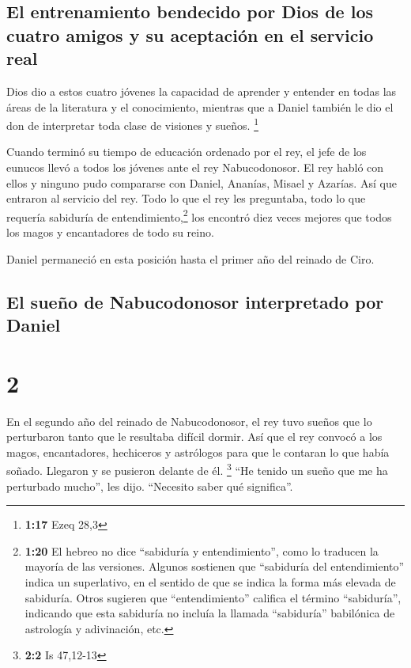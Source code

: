 \hypertarget{el-entrenamiento-bendecido-por-dios-de-los-cuatro-amigos-y-su-aceptaciuxf3n-en-el-servicio-real}{%
\subsection{El entrenamiento bendecido por Dios de los cuatro amigos y
su aceptación en el servicio
real}\label{el-entrenamiento-bendecido-por-dios-de-los-cuatro-amigos-y-su-aceptaciuxf3n-en-el-servicio-real}}

 Dios dio a estos cuatro jóvenes la capacidad de aprender
y entender en todas las áreas de la literatura y el conocimiento,
mientras que a Daniel también le dio el don de interpretar toda clase de
visiones y sueños. \footnote{\textbf{1:17} Ezeq 28,3}

 Cuando terminó su tiempo de educación ordenado por el
rey, el jefe de los eunucos llevó a todos los jóvenes ante el rey
Nabucodonosor.  El rey habló con ellos y ninguno pudo
compararse con Daniel, Ananías, Misael y Azarías. Así que entraron al
servicio del rey.  Todo lo que el rey les preguntaba,
todo lo que requería sabiduría de entendimiento,\footnote{\textbf{1:20}
  El hebreo no dice ``sabiduría y entendimiento'', como lo traducen la
  mayoría de las versiones. Algunos sostienen que ``sabiduría del
  entendimiento'' indica un superlativo, en el sentido de que se indica
  la forma más elevada de sabiduría. Otros sugieren que
  ``entendimiento'' califica el término ``sabiduría'', indicando que
  esta sabiduría no incluía la llamada ``sabiduría'' babilónica de
  astrología y adivinación, etc.} los encontró diez veces mejores que
todos los magos y encantadores de todo su reino.

 Daniel permaneció en esta posición hasta el primer año
del reinado de Ciro.

\hypertarget{el-sueuxf1o-de-nabucodonosor-interpretado-por-daniel}{%
\subsection{El sueño de Nabucodonosor interpretado por
Daniel}\label{el-sueuxf1o-de-nabucodonosor-interpretado-por-daniel}}

\hypertarget{section-1}{%
\section{2}\label{section-1}}

 En el segundo año del reinado de Nabucodonosor, el rey
tuvo sueños que lo perturbaron tanto que le resultaba difícil dormir.
 Así que el rey convocó a los magos, encantadores,
hechiceros y astrólogos para que le contaran lo que había soñado.
Llegaron y se pusieron delante de él. \footnote{\textbf{2:2} Is 47,12-13}
 ``He tenido un sueño que me ha perturbado mucho'', les
dijo. ``Necesito saber qué significa''.

